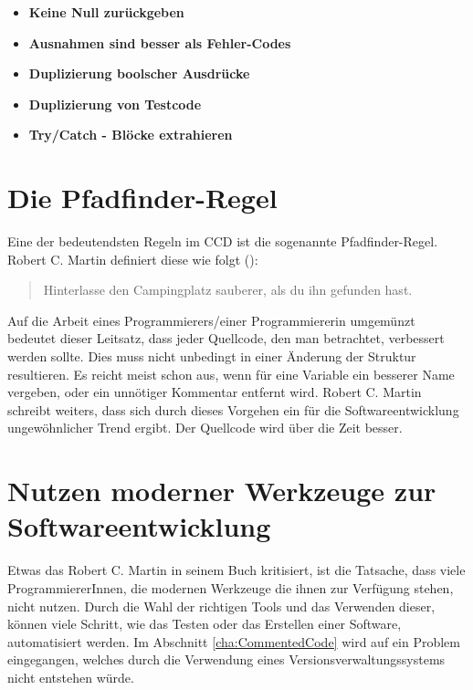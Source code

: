 \begin{itemize}
	\item \textbf{Keine Null zurückgeben}
	\item \textbf{Ausnahmen sind besser als Fehler-Codes}
	\item \textbf{Duplizierung boolscher Ausdrücke}
	\item \textbf{Duplizierung von Testcode}
	\item \textbf{Try/Catch - Blöcke extrahieren}
\end{itemize}

\section{Die Pfadfinder-Regel}
Eine der bedeutendsten Regeln im CCD ist die sogenannte Pfadfinder-Regel. Robert C. Martin definiert diese wie folgt (\cite[Seite 43]{Martin2008}):

\begin{quote}
	Hinterlasse den Campingplatz sauberer, als du ihn gefunden hast.
\end{quote}

Auf die Arbeit eines Programmierers/einer Programmiererin umgemünzt bedeutet dieser Leitsatz, dass jeder Quellcode, den man betrachtet, verbessert werden sollte. Dies muss nicht unbedingt in einer Änderung der Struktur resultieren. Es reicht meist schon aus, wenn für eine Variable ein besserer Name vergeben, oder ein unnötiger Kommentar entfernt wird. Robert C. Martin schreibt weiters, dass sich durch dieses Vorgehen ein für die Softwareentwicklung ungewöhnlicher Trend ergibt. Der Quellcode wird über die Zeit besser. 

\section{Nutzen moderner Werkzeuge zur Softwareentwicklung}
\label{cha:UsefullTools}
Etwas das Robert C. Martin in seinem Buch kritisiert, ist die Tatsache, dass viele ProgrammiererInnen, die modernen Werkzeuge die ihnen zur Verfügung stehen, nicht nutzen. Durch die Wahl der richtigen Tools und das Verwenden dieser, können viele Schritt, wie das Testen oder das Erstellen einer Software, automatisiert werden. Im Abschnitt \ref{cha:CommentedCode} wird auf ein Problem eingegangen, welches durch die Verwendung eines Versionsverwaltungssystems nicht entstehen würde.

